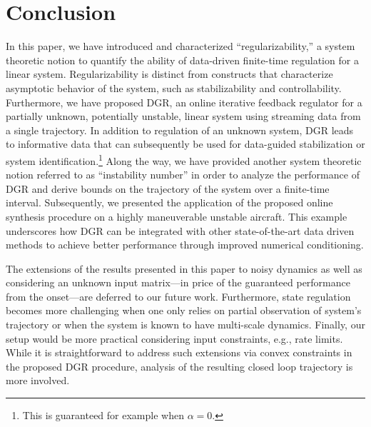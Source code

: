 \documentclass[journal]{IEEEtran}
\theoremstyle{definition}
\theoremstyle{remark}
\begin{document}
\section{Conclusion}
\label{sec:conclusion}
{    In this paper, we have introduced and characterized ``regularizability,'' a system theoretic notion to quantify the ability of data-driven finite-time regulation for a linear system. Regularizability is distinct from constructs that characterize asymptotic behavior of the system, such as stabilizability and controllability.
    Furthermore, we have proposed \ac{DGR}, an online iterative feedback regulator for a partially unknown, potentially unstable, linear system using streaming data from a single trajectory.
	In addition to regulation of an unknown system, \ac{DGR} leads to informative data that can subsequently be used 
	for data-guided stabilization or system identification.\footnote{
	{\color{violet} This is guaranteed for example when $\alpha = 0$.}}
    Along the way, we have provided another system theoretic notion referred to as ``instability number'' in order to analyze the performance of DGR and derive bounds on the trajectory of the system over a finite-time interval.}
	Subsequently, we presented the application of the proposed online synthesis procedure on a highly maneuverable unstable aircraft. This example underscores {\color{PineGreen} how \ac{DGR} can be integrated with other state-of-the-art data driven methods to achieve better performance through improved numerical conditioning}.
	
	
	The extensions of the results presented in this paper to noisy dynamics as well as considering an unknown input matrix---in price of the guaranteed performance from the onset---are deferred to our future work.
	Furthermore, state regulation becomes more challenging when one only relies on partial observation of system's trajectory or when the system is known to have multi-scale dynamics.
	Finally, our setup would be more practical considering input constraints, e.g.,
	rate limits.
	While it is straightforward to address such extensions via convex constraints in the proposed DGR procedure, analysis of the resulting closed loop trajectory
	is more involved.

	
\end{document}
